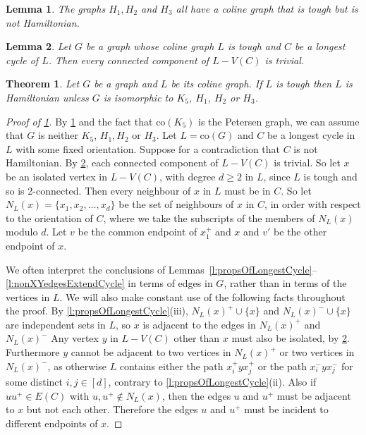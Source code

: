 \documentclass[10pt,a4paper]{amsart}
\newtheorem{thm}{Theorem}
\newtheorem{lem}{Lemma}
\newcommand{\co}{\text{co}}
\begin{document}
\begin{lem}\label{l:Hs}
The graphs $H_1,H_2$ and $H_3$ all have a coline graph that is tough but is not Hamiltonian.
\end{lem}

\begin{lem}\label{l:eachCompTrivial}
Let $G$ be a graph whose coline graph $L$ is tough and $C$ be a longest cycle of $L$. Then every connected component of $L-V(C)$ is trivial.
\end{lem}

\begin{thm}\label{t:main}
Let $G$ be a graph and $L$ be its coline graph. If $L$ is tough then $L$ is Hamiltonian unless $G$ is isomorphic to $K_5$, $H_1$, $H_2$ or $H_3$.
\end{thm}

\begin{proof}[Proof of \cref{t:main}]
By \cref{l:Hs} and the fact that $\co(K_5)$ is the Petersen graph, we can assume that $G$ is neither $K_5$, $H_1,H_2$ or $H_3$.
Let $L = \co(G)$ and  $C$ be a longest cycle in $L$ with some fixed orientation. Suppose for a contradiction that $C$ is not Hamiltonian.
By \cref{l:eachCompTrivial}, each connected component of $L-V(C)$ is trivial. 
So let $x$ be an isolated vertex in $L-V(C)$, with degree $d \geq 2$ in $L$, since $L$ is tough and so is 2-connected. Then every neighbour of $x$ in $L$ must be in $C$. So let $N_L(x) = \{x_1,x_2,\ldots, x_d\}$ be the set of neighbours of $x$ in $C$, in order with respect to the orientation of $C$, where 
we take the subscripts of the members of $N_L(x)$ modulo $d$.
Let $v$ be the common endpoint of $x_1^+$ and $x$ and $v'$ be the other endpoint of $x$.

We often interpret the conclusions of Lemmas~\ref{l:propsOfLongestCycle}--\ref{l:nonXYedgesExtendCycle} in terms of edges in $G$, rather than in terms of the vertices in $L$.
We will also make constant use of the following facts throughout the proof. 
By \cref{l:propsOfLongestCycle}(iii), $N_L(x)^+\cup \{x\}$ and $N_L(x)^-\cup \{x\}$ are independent sets in $L$, so $x$ is adjacent to the edges in $N_L(x)^+$ and $N_L(x)^-$
Any vertex $y$ in $L-V(C)$ other than $x$ must also be isolated, by \cref{l:eachCompTrivial}. 
Furthermore $y$ cannot be adjacent to two vertices in $N_L(x)^+$ or two vertices in $ N_L(x)^-$, as otherwise $L$ contains either the path $x_i^+ y x_j^+$ or the path $x_i^- y x_j^-$ for some distinct $i, j \in [d]$, contrary to \cref{l:propsOfLongestCycle}(ii).
Also if $uu^+ \in E(C)$ with $u,u^+ \notin N_L(x)$, then the edges $u$ and $u^+$ must be adjacent to $x$ but not each other. Therefore the edges $u$ and $u^+$ must be incident to different endpoints of $x$.


\end{proof}
\end{document}

